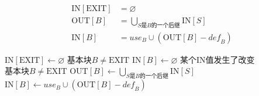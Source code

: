 \documentclass{article}
\begin{document}
\begin{align*}
    \text{IN}[\text{EXIT}] &= \varnothing \\
    \text{OUT}[B] &= \bigcup_{S\text{是}B\text{的一个后继}}{\text{IN}[S]} \\
    \text{IN}[B] &= \textit{use}_B \cup (\text{OUT}[B] - \textit{def}_B)
\end{align*}

\begin{codebox}
	\li $\text{IN}[\text{EXIT}] \gets \varnothing$
	\li \For $\text{基本块}B \ne \text{EXIT}$
		\Do
	\li 	$\text{IN}[B] \gets \varnothing$
        \End
    \li \While 某个IN值发生了改变
        \Do
    \li     \For $\text{基本块}B \ne \text{EXIT}$
            \Do
    \li         $\text{OUT}[B] \gets \bigcup_{S\text{是}B\text{的一个后继}}{\text{IN}[S]}$
    \li         $\text{IN}[B] \gets \textit{use}_B \cup (\text{OUT}[B] - \textit{def}_B)$
            \End
        \End
\end{codebox}
\end{document}
